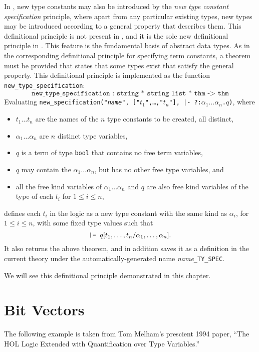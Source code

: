 In \HOLW{}, new type constants may also be introduced by the
{\it new type constant specification\/} principle,
where apart from any particular existing types, new types may be
introduced according to a general property that describes them.
This definitional principle is not present in \HOL{}, and
it is the sole new definitional principle in \HOLW.
This feature is the fundamental basis of abstract data types.
As in the corresponding definitional principle for specifying term constants,
a theorem must be provided that states that some types exist that
satisfy the general property.
This definitional principle is implemented as the \ML{} function
\texttt{new\_type\_specification}:
\[\texttt{new\_type\_specification~:~string * string list * thm~->~thm}\]
%
Evaluating
\texttt{new\_specification("\mbox{\it name}",~["$t_1$",\ldots,"$t_n$"],~|-~?:$\alpha_1 \ldots \alpha_n${.}$q$)},
where
\begin{itemize}
\item $t_1 \ldots t_n$ are the names of the $n$ type constants to be created,
all distinct,
\item $\alpha_1 \ldots \alpha_n$ are $n$ distinct type variables,
\item $q$ is a term of type \texttt{bool} that contains no free term variables,
\item $q$ may contain the $\alpha_1 \ldots \alpha_n$,
but has no other free type variables, and
\item all the free kind variables of $\alpha_1 \ldots \alpha_n$ and $q$
are also free kind variables of the type of each $t_i$ for $1 \le i \le n$,
\end{itemize}
defines each $t_i$ in the logic as a new type constant with the same kind as
$\alpha_i$, for $1 \le i \le n$, with some fixed type values such that
\[\mbox{\texttt{|- }}q [ t_1,\ldots,t_n / \alpha_1,\ldots,\alpha_n ].\]
It also returns the above theorem, and in addition saves it
as a definition in the current theory under the automatically-generated
name {\it name}{\tt \_TY\_SPEC}.

We will see this definitional principle demonstrated in
this chapter.


\section{Bit Vectors}

The following example is taken from Tom Melham's prescient 1994 paper,
``The HOL Logic Extended with Quantification over Type Variables.''

